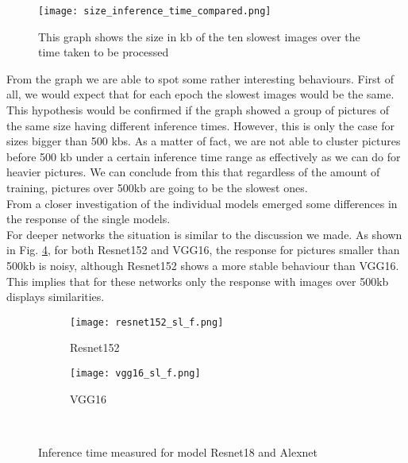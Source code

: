 \begin{figure}[h]
       \centering 
	    \texttt{[image: size\_inference\_time\_compared.png]}
        \caption[Size of the images over inference time]{This graph shows the size in kb of the ten slowest images over the time taken to be processed }
         \label{fig:size_inference_time_compared}
\end{figure}



From the graph we are able to spot some rather interesting behaviours. First of all, we would expect that for each epoch the slowest images would be the same. This hypothesis would be confirmed if the graph showed a group of pictures of the same size having different inference times. However, this is only the case for sizes bigger than 500 kbs. As a matter of fact, we are not able to cluster pictures before 500 kb under a certain inference time range as effectively as we can do for heavier pictures. We can conclude from this that regardless of the amount of training, pictures over 500kb are going to be the slowest ones. \\
From a closer investigation of the individual models emerged some differences in the response of the single models. \\
For deeper networks the situation is similar to the discussion we made. As shown in Fig. \ref{fig:sl_f_deep}, for both Resnet152 and VGG16, the response for pictures smaller than 500kb is noisy, although Resnet152 shows a more stable behaviour than VGG16. This implies that for these networks only the response with images over 500kb displays similarities.  
\begin{figure}[h]
     \begin{subfigure}{0.5\textwidth}
	    \texttt{[image: resnet152\_sl\_f.png]}
	    \caption{Resnet152}
         \label{fig:resnet152_sl_f}
         
     \end{subfigure}
     \hfill
     \begin{subfigure}{0.5\textwidth}
	    \texttt{[image: vgg16\_sl\_f.png]}
	    \caption{VGG16}
        \label{fig:vgg16_sl_f}
        
     \end{subfigure}\\
     \caption{Inference time measured for model Resnet18 and Alexnet}
        \label{fig:sl_f_deep}
\end{figure}

